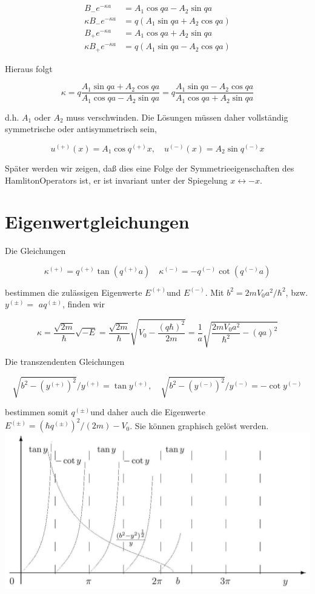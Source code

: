 \documentclass[10pt, letterpaper]{article}
\begin{document}
$$
\begin{aligned}
B_{-} e^{-\kappa a} & =A_{1} \cos q a-A_{2} \sin q a \\
\kappa B_{-} e^{-\kappa a} & =q\left(A_{1} \sin q a+A_{2} \cos q a\right) \\
B_{+} e^{-\kappa a} & =A_{1} \cos q a+A_{2} \sin q a \\
\kappa B_{+} e^{-\kappa a} & =q\left(A_{1} \sin q a-A_{2} \cos q a\right)
\end{aligned}
$$

Hieraus folgt

$$
\kappa=q \frac{A_{1} \sin q a+A_{2} \cos q a}{A_{1} \cos q a-A_{2} \sin q a}=q \frac{A_{1} \sin q a-A_{2} \cos q a}{A_{1} \cos q a+A_{2} \sin q a}
$$

d.h. $A_{1}$ oder $A_{2}$ muss verschwinden. Die Lösungen müssen daher vollständig symmetrische oder antisymmetrisch sein,

$$
u^{(+)}(x)=A_{1} \cos q^{(+)} x, \quad u^{(-)}(x)=A_{2} \sin q^{(-)} x
$$

Später werden wir zeigen, daß dies eine Folge der Symmetrieeigenschaften des HamlitonOperators ist, er ist invariant unter der Spiegelung $x \leftrightarrow-x$.

\section*{Eigenwertgleichungen}
Die Gleichungen

$$
\kappa^{(+)}=q^{(+)} \tan \left(q^{(+)} a\right) \quad \kappa^{(-)}=-q^{(-)} \cot \left(q^{(-)} a\right)
$$

bestimmen die zulässigen Eigenwerte $E^{(+)}$und $E^{(-)}$. Mit $b^{2}=2 m V_{0} a^{2} / \hbar^{2}$, bzw. $y^{( \pm)}=$ $a q^{( \pm)}$, finden wir

$$
\kappa=\frac{\sqrt{2 m}}{\hbar} \sqrt{-E}=\frac{\sqrt{2 m}}{\hbar} \sqrt{V_{0}-\frac{(q \hbar)^{2}}{2 m}}=\frac{1}{a} \sqrt{\frac{2 m V_{0} a^{2}}{\hbar^{2}}-(q a)^{2}}
$$

Die transzendenten Gleichungen

$$
\sqrt{b^{2}-\left(y^{(+)}\right)^{2}} / y^{(+)}=\tan y^{(+)}, \quad \sqrt{b^{2}-\left(y^{(-)}\right)^{2}} / y^{(-)}=-\cot y^{(-)}
$$

bestimmen somit $q^{( \pm)}$und daher auch die Eigenwerte $E^{( \pm)}=\left(\hbar q^{( \pm)}\right)^{2} /(2 m)-V_{0}$. Sie können graphisch gelöst werden.\\
\includegraphics[scale=0.2, center]{2025_05_21_2790b5a0182e53887e3bg-16}
\end{document}
